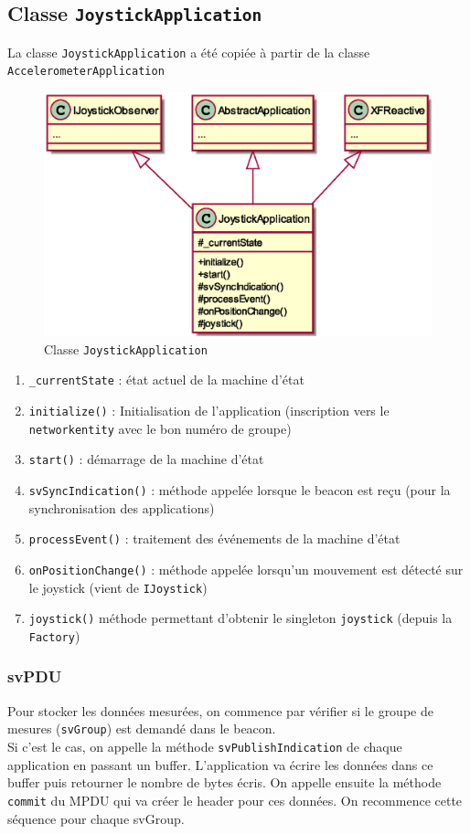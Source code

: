 \documentclass[DeseNET_Sebastien_Deriaz]{subfiles}
\begin{document}
\subsection{Classe \texttt{JoystickApplication}}
La classe \verb!JoystickApplication! a été copiée à partir de la classe \verb!AccelerometerApplication!
\begin{figure}[H]
\centering
\includegraphics[scale=0.5]{out/JoystickApplication.eps}
\caption{Classe \texttt{JoystickApplication}}
\end{figure}
\begin{enumerate}
\item \verb!_currentState! : état actuel de la machine d'état
\item \verb!initialize()! : Initialisation de l'application (inscription vers le \verb!networkentity! avec le bon numéro de groupe)
\item \verb!start()! : démarrage de la machine d'état
\item \verb!svSyncIndication()! : méthode appelée lorsque le beacon est reçu (pour la synchronisation des applications)
\item \verb!processEvent()! : traitement des événements de la machine d'état
\item \verb!onPositionChange()! : méthode appelée lorsqu'un mouvement est détecté sur le joystick (vient de \verb!IJoystick!)
\item \verb!joystick()! méthode permettant d'obtenir le singleton \verb!joystick! (depuis la \verb!Factory!)
\end{enumerate}
\pagebreak
\subsubsection{svPDU}
Pour stocker les données mesurées, on commence par vérifier si le groupe de mesures (\verb!svGroup!) est demandé dans le beacon.\\
Si c'est le cas, on appelle la méthode \verb!svPublishIndication! de chaque application en passant un buffer. L'application va écrire les données dans ce buffer puis retourner le nombre de bytes écris. On appelle ensuite la méthode \verb!commit! du MPDU qui va créer le header pour ces données. On recommence cette séquence pour chaque svGroup.
\end{document}
